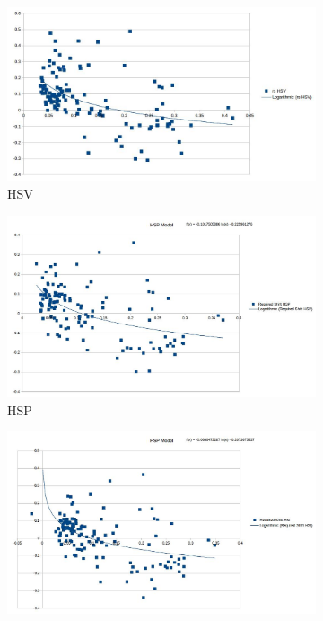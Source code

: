 \begin{figure}
\centering
\begin{subfigure}{.49\linewidth}
  \includegraphics[width=1\linewidth]{figures/model/scatter/model_hsv.jpg}
  \caption{HSV}
\end{subfigure}
\hfill
\begin{subfigure}{.49\linewidth}
  \includegraphics[width=1\linewidth]{figures/model/scatter/model_hsp.jpg}
  \caption{HSP}
\end{subfigure}
\hfill
\begin{subfigure}{.49\linewidth}
  \includegraphics[width=1\linewidth]{figures/model/scatter/model_hsi.jpg}

\end{subfigure}
\end{figure}
